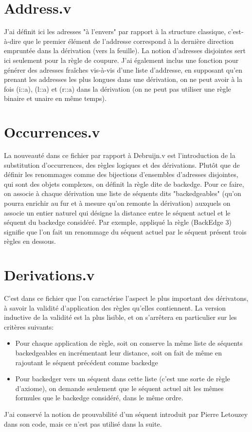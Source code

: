 \documentclass[12pt]{article}
\theoremstyle{break}
\begin{document}
\section{Address.v}
J'ai définit ici les adresses "à l'envers" par rapport à la structure classique, c'est-à-dire que le premier élément de l'addresse correspond à
la dernière direction empruntée dans la dérivation (vers la feuille).
La notion d'adresses disjointes sert ici seulement pour la règle de coupure. J'ai également inclus une fonction pour générer des adresses
fraîches vis-à-vis d'une liste d'addresse, en supposant qu'en prenant les addresses les plus longues dans une dérivation, on ne peut avoir à la fois
(i::a), (l::a) et (r::a) dans la dérivation (on ne peut pas utiliser une règle binaire et unaire en même temps).

\section{Occurrences.v}
La nouveauté dans ce fichier par rapport à Debruijn.v est l'introduction de la substitution d'occurrences, des règles logiques et des dérivations.
Plutôt que de définir les renommages comme des bijections d'ensembles d'adresses disjointes, qui sont des objets complexes, on définit la règle dite de
backedge. Pour ce faire, on associe à chaque dérivation une liste de séquents dits "backedgeables" (qu'on pourra enrichir au fur et à mesure qu'on 
remonte la dérivation) auxquels on associe un entier naturel qui désigne la distance entre le séquent actuel et le séquent du backedge considéré.
Par exemple, appliqué la règle (BackEdge 3) signifie que l'on fait un renommage du séquent actuel par le séquent présent trois règles en dessous.

\section{Derivations.v}
C'est dans ce fichier que l'on caractérise l'aspect le plus important des dérivatons, à savoir la validité d'application des règles qu'elles contiennent.
La version inductive de la validité est la plus lisible, et on s'arrêtera en particulier sur les critères suivants:
\begin{itemize}
\item Pour chaque application de règle, soit on conserve la même liste de séquents backedgeables en incrémentant leur distance, soit on 
	fait de même en rajoutant le séquent précédent comme backedge
\item Pour backedger vers un séquent dans cette liste (c'est une sorte de règle d'axiome), on demande seulement que le séquent actuel 
	ait les mêmes formules que le backedge considéré, dans le même ordre. 
\end{itemize} 
J'ai conservé la notion de prouvabilité d'un séquent introduit par Pierre Letouzey dans son code, mais ce n'est pas utilisé dans la suite.
\end{document}
